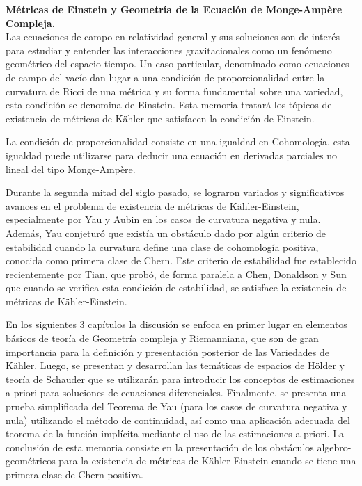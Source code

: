 \textbf{M\'etricas de Einstein y Geometr\'ia de la Ecuaci\'on de Monge-Amp\`ere Compleja.}\\

Las ecuaciones de campo en relatividad general y sus soluciones son de inter\'es para estudiar y entender las interacciones gravitacionales como un fen\'omeno geom\'etrico del espacio-tiempo. Un caso particular, denominado como ecuaciones de campo del vac\'io dan lugar a una condici\'on de proporcionalidad entre la curvatura de Ricci de una m\'etrica y su forma fundamental sobre una variedad, esta condici\'on se denomina de Einstein. Esta memoria tratar\'a los t\'opicos de existencia de m\'etricas de K\"{a}hler que satisfacen la condici\'on de Einstein.

\vspace{2mm}

La condici\'on de proporcionalidad consiste en una igualdad en Cohomolog\'ia, esta igualdad puede utilizarse para deducir una ecuaci\'on en derivadas parciales no lineal del tipo Monge-Amp\`ere. 

\vspace{2mm}

Durante la segunda mitad del siglo pasado, se lograron variados y significativos avances en el problema de existencia de m\'etricas de K\"{a}hler-Einstein, especialmente por Yau y Aubin en los casos de curvatura negativa y nula. Adem\'as, Yau conjetur\'o que exist\'ia un obst\'aculo dado por alg\'un criterio de estabilidad cuando la curvatura define una clase de cohomolog\'ia positiva, conocida como primera clase de Chern. Este criterio de estabilidad fue establecido recientemente por Tian, que prob\'o, de forma paralela a Chen, Donaldson y Sun que cuando se verifica esta condici\'on de estabilidad, se satisface la existencia de m\'etricas de K\"{a}hler-Einstein.

\vspace{2mm}

En los siguientes 3 cap\'itulos la discusi\'on se enfoca en primer lugar en elementos b\'asicos de teor\'ia de Geometr\'ia compleja y Riemanniana, que son de gran importancia para la definici\'on y presentaci\'on posterior de las Variedades de K\"{a}hler. Luego, se presentan y desarrollan las tem\'aticas de espacios de H\"{o}lder y teor\'ia de Schauder que se utilizar\'an para introducir los conceptos de estimaciones a priori para soluciones de ecuaciones diferenciales. Finalmente, se presenta una prueba simplificada del Teorema de Yau (para los casos de curvatura negativa y nula) utilizando el m\'etodo de continuidad, as\'i como una aplicaci\'on adecuada del teorema de la funci\'on impl\'icita mediante el uso de las estimaciones a priori. La conclusi\'on de esta memoria consiste en la presentaci\'on de los obst\'aculos algebro-geom\'etricos para la existencia de m\'etricas de K\"{a}hler-Einstein cuando se tiene una primera clase de Chern positiva.

